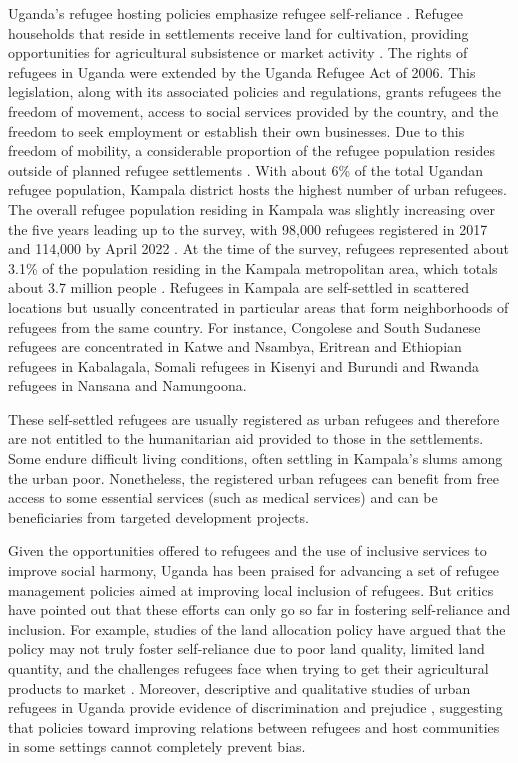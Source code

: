 \documentclass[a4paper,12pt]{article}
\begin{document}
Uganda's refugee hosting policies emphasize refugee self-reliance \citep{clements2016uganda, betts2023refugees}. Refugee households that reside in settlements receive land for cultivation, providing opportunities for agricultural subsistence or market activity \citep{betts2017refugee, betts2019refugee, kadigo22}. The rights of refugees in Uganda were extended by the Uganda Refugee Act of 2006. This legislation, along with its associated policies and regulations, grants refugees the freedom of movement, access to social services provided by the country, and the freedom to seek employment or establish their own businesses. Due to this freedom of mobility, a considerable proportion of the refugee population resides outside of planned refugee settlements \citep{UNDP2017Uganda, KampPop2022}. With about 6\% of the total Ugandan refugee population, Kampala district hosts the highest number of urban refugees. The overall refugee population residing in Kampala was slightly increasing over the five years leading up to the survey, with 98,000 refugees registered in 2017 and 114,000 by April 2022 \citep{saliba2020cities, KampPop}. At the time of the survey, refugees represented about 3.1\% of the population residing in the Kampala metropolitan area, which totals about 3.7 million people \citep{WorldPopReviewKampala}. Refugees in Kampala are self-settled in scattered locations but usually concentrated in particular areas that form neighborhoods of refugees from the same country. For instance, Congolese and South Sudanese refugees are concentrated in Katwe and Nsambya, Eritrean and Ethiopian refugees in Kabalagala, Somali refugees in Kisenyi and Burundi and Rwanda refugees in Nansana and Namungoona. 

These self-settled refugees are usually registered as urban refugees and therefore are not entitled to the humanitarian aid provided to those in the settlements. Some endure difficult living conditions, often settling in Kampala's slums among the urban poor. Nonetheless, the registered urban refugees can benefit from free access to some essential services (such as medical services) and can be beneficiaries from targeted development projects. 

Given the opportunities offered to refugees and the use of inclusive services to improve social harmony, Uganda has been praised for advancing a set of refugee management policies aimed at improving local inclusion of refugees. But critics have pointed out that these efforts can only go so far in fostering self-reliance and inclusion. For example, studies of the land allocation policy have argued that the policy may not truly foster self-reliance due to poor land quality, limited land quantity, and the challenges refugees face when trying to get their agricultural products to market \citep{bohnet2019uganda, kaiser2006between, betts2019refugee}. Moreover, descriptive and qualitative studies of urban refugees in Uganda provide evidence of discrimination and prejudice \citep{hook2015sharing, stark2015he}, suggesting that policies toward improving relations between refugees and host communities in some settings cannot completely prevent bias. 
\end{document}

